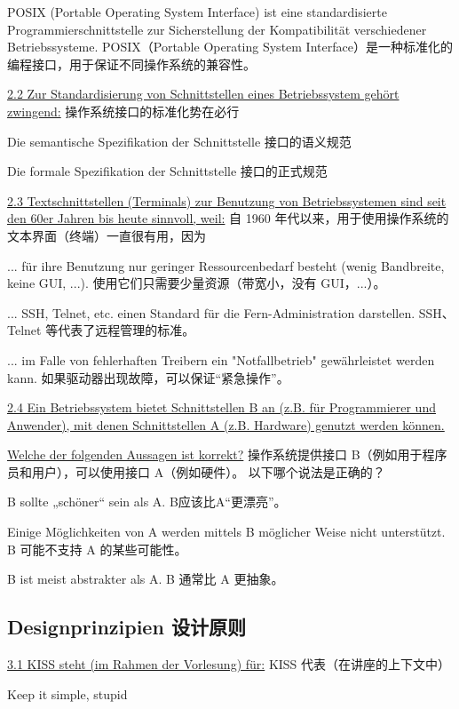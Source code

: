\documentclass[fleqn]{article}
\begin{document}
POSIX (Portable Operating System Interface) ist eine standardisierte Programmierschnittstelle zur Sicherstellung der Kompatibilität verschiedener Betriebssysteme.
POSIX（Portable Operating System Interface）是一种标准化的编程接口，用于保证不同操作系统的兼容性。

\noindent\uline{2.2 Zur Standardisierung von Schnittstellen eines Betriebssystem gehört zwingend:} 操作系统接口的标准化势在必行

Die semantische Spezifikation der Schnittstelle 接口的语义规范
	
Die formale Spezifikation der Schnittstelle 接口的正式规范

\noindent\uline{2.3 Textschnittstellen (Terminals) zur Benutzung von Betriebssystemen sind seit den 60er Jahren bis heute sinnvoll, weil:}  自 1960 年代以来，用于使用操作系统的文本界面（终端）一直很有用，因为
	
... für ihre Benutzung nur geringer Ressourcenbedarf besteht (wenig Bandbreite, keine GUI, ...).
使用它们只需要少量资源（带宽小，没有 GUI，...）。

... SSH, Telnet, etc. einen Standard für die Fern-Administration darstellen.
SSH、Telnet 等代表了远程管理的标准。

... im Falle von fehlerhaften Treibern ein "Notfallbetrieb" gewährleistet werden kann.
如果驱动器出现故障，可以保证“紧急操作”。

\noindent\uline{2.4 Ein Betriebssystem bietet Schnittstellen B an (z.B. für Programmierer und Anwender), mit denen Schnittstellen A (z.B. Hardware) genutzt werden können.}

\uline{Welche der folgenden Aussagen ist korrekt?}
操作系统提供接口 B（例如用于程序员和用户），可以使用接口 A（例如硬件）。 以下哪个说法是正确的？

B sollte „schöner“ sein als A.
B应该比A“更漂亮”。

Einige Möglichkeiten von A werden mittels B möglicher Weise nicht unterstützt.
B 可能不支持 A 的某些可能性。

B ist meist abstrakter als A.
B 通常比 A 更抽象。


\subsection{Designprinzipien 设计原则} 

\noindent\uline{3.1 KISS steht (im Rahmen der Vorlesung) für:} KISS 代表（在讲座的上下文中）

Keep it simple, stupid
\end{document}

